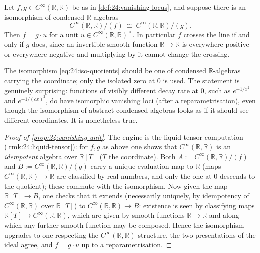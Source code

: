 \begin{proposition}
\label{prop:24:vanishing-unit}
Let $f,g\in C^\infty(\mathbb R,\mathbb R)$ be as in
\cref{def:24:vanishing-locus}, and suppose there is an isomorphism of condensed
$\mathbb R$-algebras
\begin{equation}
\label{eq:24:iso-quotients}
C^\infty(\mathbb R,\mathbb R)/(f)\ \cong\ C^\infty(\mathbb R,\mathbb R)/(g).
\end{equation}
Then $f=g\cdot u$ for a unit $u\in C^\infty(\mathbb R,\mathbb R)^\times$. In
particular $f$ crosses the line if and only if $g$ does, since an invertible
smooth function $\mathbb R\to\mathbb R$ is everywhere positive or everywhere
negative and multiplying by it cannot change the crossing.
\end{proposition}

\begin{remark}
\label{rmk:24:iso-coordinate}
The isomorphism \eqref{eq:24:iso-quotients} should be one of condensed
$\mathbb R$-algebras carrying the coordinate; only the isolated zero at $0$ is
used. The statement is genuinely surprising: functions of visibly different
decay rate at $0$, such as $e^{-1/x^2}$ and $e^{-1/(cx)^2}$, do have isomorphic
vanishing loci (after a reparametrisation), even though the isomorphism of
abstract condensed algebras looks as if it should see different coordinates. It
is nonetheless true.
\end{remark}

\begin{proof}[Proof of \cref{prop:24:vanishing-unit}]
The engine is the liquid tensor computation (\cref{rmk:24:liquid-tensor}): for
$f,g$ as above one shows that $C^\infty(\mathbb R,\mathbb R)$ is an
\emph{idempotent} algebra over $\mathbb R[T]$ ($T$ the coordinate). Both
$A:=C^\infty(\mathbb R,\mathbb R)/(f)$ and $B:=C^\infty(\mathbb R,\mathbb R)/(g)$
carry a unique evaluation map to $\mathbb R$ (maps $C^\infty(\mathbb R,\mathbb R)\to
\mathbb R$ are classified by real numbers, and only the one at $0$ descends to the
quotient); these commute with the isomorphism. Now given the map
$\mathbb R[T]\to B$, one checks that it extends (necessarily uniquely, by
idempotency of $C^\infty(\mathbb R,\mathbb R)$ over $\mathbb R[T]$) to
$C^\infty(\mathbb R,\mathbb R)\to B$: existence is seen by classifying maps
$\mathbb R[T]\to C^\infty(\mathbb R,\mathbb R)$, which are given by smooth
functions $\mathbb R\to\mathbb R$ and along which any further smooth function may
be composed. Hence the isomorphism upgrades to one respecting the
$C^\infty(\mathbb R,\mathbb R)$-structure, the two presentations of the ideal
agree, and $f=g\cdot u$ up to a reparametrisation.
\end{proof}

